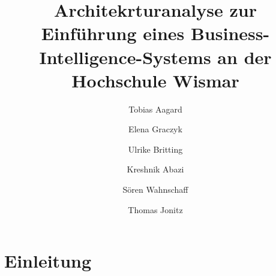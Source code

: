 \documentclass{../tex/hswpaper}
\author{Tobias Aagard\and Elena Graczyk\and Ulrike Britting\and Kreshnik Abazi\and Sören Wahnschaff\and Thomas Jonitz}
\title{Architekrturanalyse zur Einführung eines Business-Intelligence-Systems an der Hochschule Wismar}
\date{\cc{Wismar, \today}}
\begin{document}
\maketitle

\section{Einleitung}
\lipsum
\end{document}
